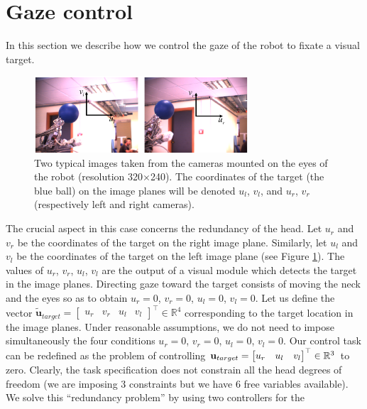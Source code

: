 \section{Gaze control}
\label{Sec:gazecontrol}

In this section we describe how we control the gaze of the robot to
fixate a visual target.
%
\begin{figure}[tbp]
\centering
\includegraphics[width=8cm]{Figure/hand.eps}
\caption{Two typical images taken from the cameras mounted on the 
eyes of the robot (resolution 320$\times$240).
The coordinates of the target (the blue ball) on the image planes
will be denoted $u_l$, $v_l$, and $u_r$, $v_r$ (respectively left 
and right cameras).}
\label{Fig:ImagePlane}
\end{figure}
% 
The crucial aspect in this case concerns the redundancy of the 
head. Let $u_r$ and $v_r$ be the coordinates of the target on the 
right image plane. Similarly, let $u_l$ and $v_l$ be the coordinates 
of the target on the 
left image plane (see Figure \ref{Fig:ImagePlane}). The values of $u_r$, 
$v_r$, $u_l$, $v_l$ are the output of a visual module which detects the
target in the image planes. Directing gaze 
toward the target 
consists of moving the neck and the eyes so as to obtain 
$u_r=0$, $v_r=0$, $u_l=0$, $v_l=0$. 
Let us define the vector 
$\tilde {\mathbf u}_{target}= \begin{bmatrix} u_r & v_r & u_l & v_l 
\end{bmatrix}^\top \in \mathbb R^4$ corresponding to the 
target location in the image planes. Under reasonable 
assumptions, we do not need to impose simultaneously 
the four conditions $u_r=0$, $v_r=0$, $u_l=0$, $v_l=0$.  Our control task 
can be redefined as the problem of controlling 
$\mathbf{u}_{target} = \begin{bmatrix} u_r & u_l & v_l \end{bmatrix}^\top \in \mathbb R^3$ 
to zero. Clearly, the task specification does not constrain all the head 
degrees of freedom (we are imposing $3$ constraints but we 
have $6$ free variables available). 
We solve this ``redundancy problem'' by using two controllers for the 
